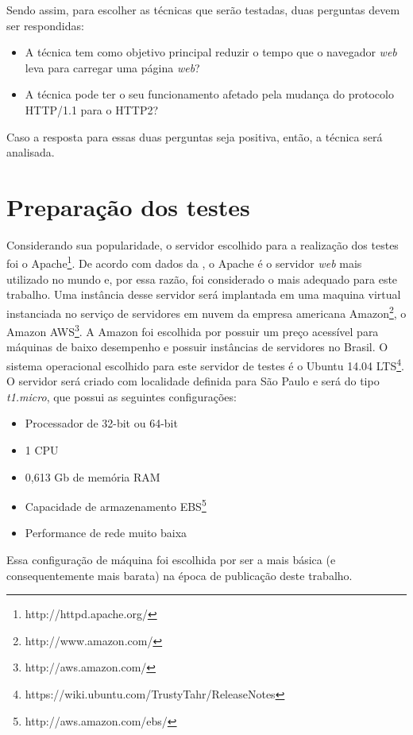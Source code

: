 Sendo assim, para escolher as técnicas que serão testadas, duas perguntas devem ser respondidas:

\begin{itemize}
	\item A técnica tem como objetivo principal reduzir o tempo que o navegador \textit{web} leva para carregar uma página \textit{web}?
	\item A técnica pode ter o seu funcionamento afetado pela mudança do protocolo HTTP/1.1 para o HTTP2?
\end{itemize}

Caso a resposta para essas duas perguntas seja positiva, então, a técnica será analisada.

\section{Preparação dos testes}
\label{sec:preparacaodostestes}

Considerando sua popularidade, o servidor escolhido para a realização dos testes foi o Apache\footnote{http://httpd.apache.org/}. De acordo com dados da , o Apache é o servidor \textit{web} mais utilizado no mundo e, por essa razão, foi considerado o mais adequado para este trabalho. Uma instância desse servidor será implantada em uma maquina virtual instanciada no serviço de servidores em nuvem da empresa americana Amazon\footnote{http://www.amazon.com/}, o Amazon AWS\footnote{http://aws.amazon.com/}. A Amazon foi escolhida por possuir um preço acessível para máquinas de baixo desempenho e possuir instâncias de servidores no Brasil. O sistema operacional escolhido para este servidor de testes é o Ubuntu 14.04 LTS\footnote{https://wiki.ubuntu.com/TrustyTahr/ReleaseNotes}. O servidor será criado com localidade definida para São Paulo e será do tipo \textit{t1.micro}, que possui as seguintes configurações:

\begin{itemize}
	\item Processador de 32-bit ou 64-bit
	\item 1 CPU
	\item 0,613 Gb de memória RAM
	\item Capacidade de armazenamento EBS\footnote{http://aws.amazon.com/ebs/}
	\item Performance de rede muito baixa
\end{itemize}

Essa configuração de máquina foi escolhida por ser a mais básica (e consequentemente mais barata) na época de publicação deste trabalho.

